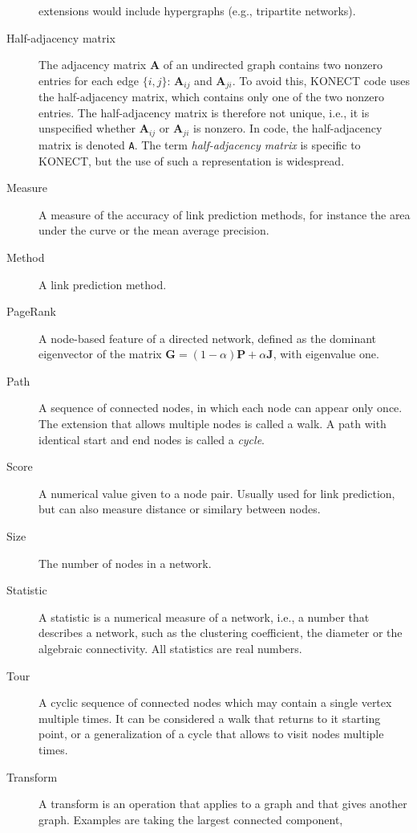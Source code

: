 \documentclass{article}
\begin{document}
\begin{description}
    extensions would include hypergraphs (e.g., tripartite networks).  
  \item[Half-adjacency matrix]
    The adjacency matrix $\mathbf A$ of an undirected graph contains two
    nonzero entries for each edge $\{i,j\}$:  $\mathbf A_{ij}$ and
    $\mathbf A_{ji}$.  To avoid this, KONECT code uses the
    half-adjacency matrix, which contains only one of the two nonzero
    entries.  The half-adjacency matrix is therefore not unique, i.e.,
    it is unspecified whether $\mathbf A_{ij}$ or $\mathbf A_{ji}$ is nonzero.  In
    code, the half-adjacency matrix is denoted \texttt{A}.  The term
    \emph{half-adjacency matrix} is specific to KONECT, but the use of
    such a representation is widespread. 
  \item[Measure]
    A measure of the accuracy of link prediction methods, for instance
    the area under the curve or the mean average precision.  
  \item[Method]
    A link prediction method. 
  \item[PageRank] 
    A node-based feature of a directed network, defined as the dominant
    eigenvector of the matrix $\mathbf G = (1-\alpha) \mathbf P +
    \alpha\mathbf J$, with eigenvalue one. 
  \item[Path]
    A sequence of connected nodes, in which each node can appear only
    once.  The extension that allows multiple nodes is called a walk.  A
    path with identical start and end nodes is called a \emph{cycle}. 
  \item[Score]
    A numerical value given to a node pair.  Usually used for link
    prediction, but can also measure distance or similary between
    nodes. 
  \item[Size]
    The number of nodes in a network.  
  \item[Statistic]
    A statistic is a numerical measure of a network, i.e., a number that
    describes a network, such as the clustering coefficient, the
    diameter or the algebraic connectivity.  All statistics are real
    numbers.   
  \item[Tour]
    A cyclic sequence of connected nodes which may contain a single
    vertex multiple times.  It can be considered a walk that returns to
    it starting point, or a generalization of a cycle that allows to
    visit nodes multiple times.  
  \item[Transform] 
    A transform is an operation that applies to a graph and that gives
    another graph.  Examples are taking the largest connected component,

\end{description}
\end{document}
